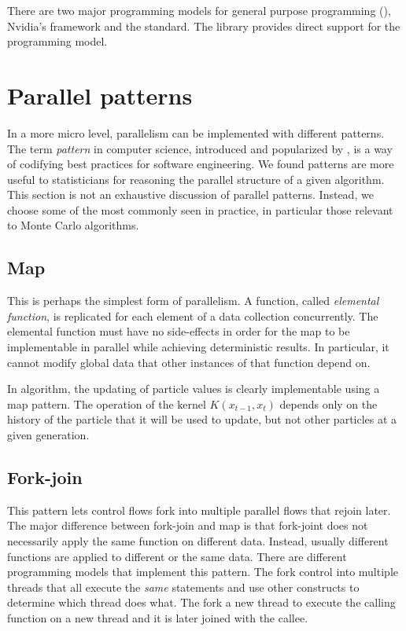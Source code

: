 There are two major programming models for general purpose \gpu programming
(\gpgpu), Nvidia's \cuda framework and the \opencl \cite{opencl} standard. The
\vsmc library provides direct support for the \opencl programming model.

\section{Parallel patterns}
\label{sec:Parallel patterns}

In a more micro level, parallelism can be implemented with different patterns.
The term \emph{pattern} in computer science, introduced and popularized by
\cite{software:GoF}, is a way of codifying best practices for software
engineering. We found patterns are more useful to statisticians for reasoning
the parallel structure of a given algorithm. This section is not an exhaustive
discussion of parallel patterns. Instead, we choose some of the most commonly
seen in practice, in particular those relevant to Monte Carlo algorithms.

\subsection{Map}
\label{sub:Map}

This is perhaps the simplest form of parallelism. A function, called
\emph{elemental function}, is replicated for each element of a data collection
concurrently. The elemental function must have no side-effects in order for
the map to be implementable in parallel while achieving deterministic results.
In particular, it cannot modify global data that other instances of that
function depend on.

In \smc algorithm, the updating of particle values is clearly implementable
using a map pattern. The operation of the kernel $K(x_{t-1},x_t)$ depends only
on the history of the particle that it will be used to update, but not other
particles at a given generation.

\subsection{Fork-join}
\label{sub:Fork-join}

This pattern lets control flows fork into multiple parallel flows that rejoin
later. The major difference between fork-join and map is that fork-joint does
not necessarily apply the same function on different data. Instead, usually
different functions are applied to different or the same data. There are
different programming models that implement this pattern. The \openmp
{} fork control into multiple threads that all
execute the \emph{same} statements and use other constructs to determine which
thread does what. The \cilk \cite{cilk}  fork a new thread to
execute the calling function on a new thread and it is later joined with the
callee.

